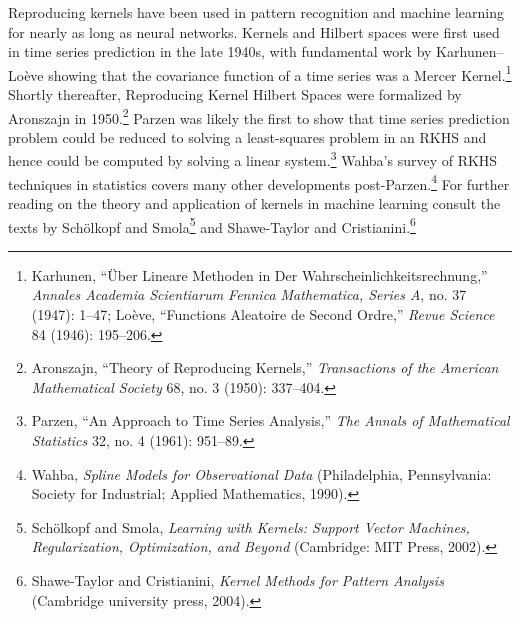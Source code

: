 \documentclass{tufte-book}
\begin{document}
Reproducing kernels have been used in pattern recognition and machine
learning for nearly as long as neural networks. Kernels and Hilbert
spaces were first used in time series prediction in the late 1940s, with
fundamental work by Karhunen--Loève showing that the covariance function
of a time series was a Mercer Kernel.\footnote{Karhunen, {``{Ü}ber
  Lineare Methoden in Der Wahrscheinlichkeitsrechnung,''} \emph{Annales
  Academia Scientiarum Fennica Mathematica, Series A}, no. 37 (1947):
  1--47; Loève, {``Functions Aleatoire de Second Ordre,''} \emph{Revue
  Science} 84 (1946): 195--206.} Shortly thereafter, Reproducing Kernel
Hilbert Spaces were formalized by Aronszajn in 1950.\footnote{Aronszajn,
  {``Theory of Reproducing Kernels,''} \emph{Transactions of the
  American Mathematical Society} 68, no. 3 (1950): 337--404.} Parzen was
likely the first to show that time series prediction problem could be
reduced to solving a least-squares problem in an RKHS and hence could be
computed by solving a linear system.\footnote{Parzen, {``An Approach to
  Time Series Analysis,''} \emph{The Annals of Mathematical Statistics}
  32, no. 4 (1961): 951--89.} Wahba's survey of RKHS techniques in
statistics covers many other developments post-Parzen.\footnote{Wahba,
  \emph{Spline Models for Observational Data} (Philadelphia,
  Pennsylvania: Society for Industrial; Applied Mathematics, 1990).} For
further reading on the theory and application of kernels in machine
learning consult the texts by Schölkopf and Smola\footnote{Schölkopf and
  Smola, \emph{Learning with Kernels: Support Vector Machines,
  Regularization, Optimization, and Beyond} (Cambridge: MIT Press,
  2002).} and Shawe-Taylor and Cristianini.\footnote{Shawe-Taylor and
  Cristianini, \emph{Kernel Methods for Pattern Analysis} (Cambridge
  university press, 2004).}
\end{document}
